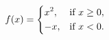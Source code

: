 \documentclass{article}
\begin{document}
\[
f(x)=
\begin{dcases}
  x^2, & \text{if }x\ge0,\\
  -x,  & \text{if }x<0.
\end{dcases}
\]
\end{document}
